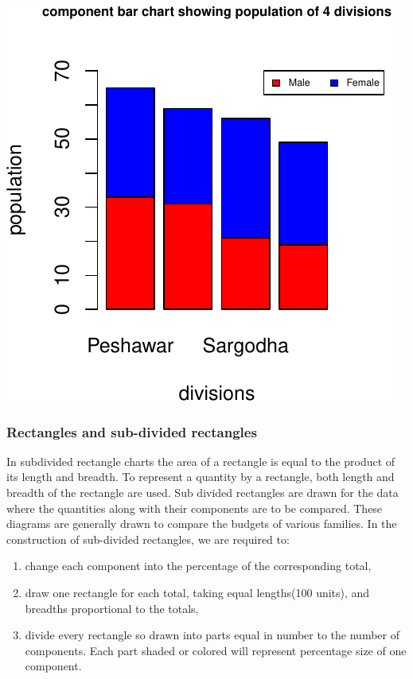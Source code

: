 \documentclass[]{article}
\providecommand{\tightlist}{%
  \setlength{\itemsep}{0pt}\setlength{\parskip}{0pt}}
\begin{document}
\includegraphics{chapt2_files/figure-latex/component bar chart-1.pdf}

\hypertarget{rectangles-and-sub-divided-rectangles}{%
\subsubsection{Rectangles and sub-divided
rectangles}\label{rectangles-and-sub-divided-rectangles}}

In subdivided rectangle charts the area of a rectangle is equal to the
product of its length and breadth. To represent a quantity by a
rectangle, both length and breadth of the rectangle are used. Sub
divided rectangles are drawn for the data where the quantities along
with their components are to be compared. These diagrams are generally
drawn to compare the budgets of various families. In the construction of
sub-divided rectangles, we are required to:

\begin{enumerate}
\def\labelenumi{\roman{enumi}.}
\tightlist
\item
  change each component into the percentage of the corresponding total,
\item
  draw one rectangle for each total, taking equal lengths(100 units),
  and breadths proportional to the totals,
\item
  divide every rectangle so drawn into parts equal in number to the
  number of components. Each part shaded or colored will represent
  percentage size of one component.
\end{enumerate}
\end{document}
